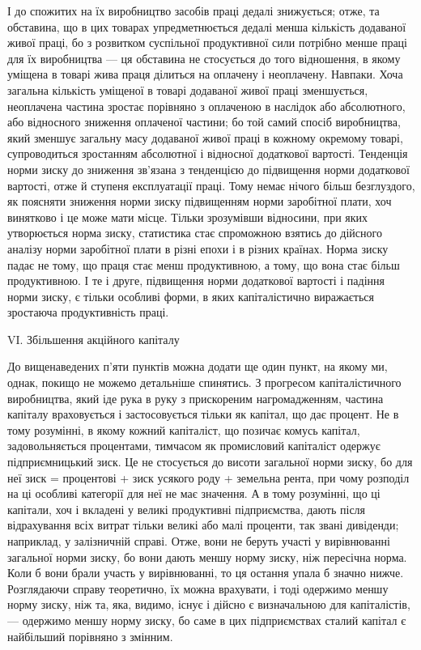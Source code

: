 І до спожитих на їх виробництво засобів праці дедалі знижується; отже, та обставина, що в цих
товарах упредметнюється дедалі менша кількість додаваної живої праці, бо з розвитком суспільної
продуктивної сили потрібно менше праці для їх виробництва — ця обставина не стосується до того
відношення, в якому уміщена в товарі жива праця ділиться на оплачену і неоплачену. Навпаки. Хоча
загальна кількість уміщеної в товарі додаваної живої праці зменшується, неоплачена частина зростає
порівняно з оплаченою в наслідок або абсолютного, або відносного зниження оплаченої частини; бо той
самий спосіб виробництва, який зменшує загальну масу додаваної живої праці в кожному окремому
товарі, супроводиться зростанням абсолютної і відносної додаткової вартості. Тенденція норми зиску
до зниження зв’язана з тенденцією до підвищення норми додаткової вартості, отже й ступеня
експлуатації праці. Тому немає нічого більш безглуздого, як поясняти зниження норми зиску
підвищенням норми заробітної плати, хоч винятково і це може мати місце. Тільки зрозумівши відносини,
при яких утворюється норма зиску, статистика стає спроможною взятись до дійсного аналізу норми
заробітної плати в різні епохи і в різних країнах. Норма зиску падає не тому, що праця стає менш
продуктивною, а тому, що вона стає більш продуктивною. І те і друге, підвищення норми додаткової
вартості і падіння норми зиску, є тільки особливі форми, в яких капіталістично виражається зростаюча
продуктивність праці.

VI. Збільшення акційного капіталу

До вищенаведених п’яти пунктів можна додати ще один пункт, на якому ми, однак, покищо не можемо
детальніше спинятись. З прогресом капіталістичного виробництва, який іде рука в руку з прискореним
нагромадженням, частина капіталу враховується і застосовується тільки як капітал, що дає процент. Не
в тому розумінні, в якому кожний капіталіст, що позичає комусь капітал, задовольняється процентами,
тимчасом як промисловий капіталіст одержує підприємницький зиск. Це не стосується до висоти
загальної норми зиску, бо для неї зиск = процентові + зиск усякого роду + земельна рента, при чому
розподіл на ці особливі категорії для неї не має значення. А в тому
розумінні, що ці капітали, хоч і вкладені у великі продуктивні підприємства, дають після
відрахування всіх витрат тільки великі або малі проценти, так звані дивіденди; наприклад, у
залізничній справі. Отже, вони не беруть участі у вирівнюванні загальної норми зиску, бо вони дають
меншу норму зиску, ніж пересічна норма. Коли б вони брали участь у вирівнюванні, то ця остання упала
б значно нижче. Розглядаючи справу теоретично, їх можна врахувати, і тоді одержимо меншу норму
зиску, ніж та, яка, видимо, існує і дійсно є визначальною для капіталістів, — одержимо меншу норму
зиску, бо саме в цих підприємствах сталий капітал є найбільший порівняно з змінним.
